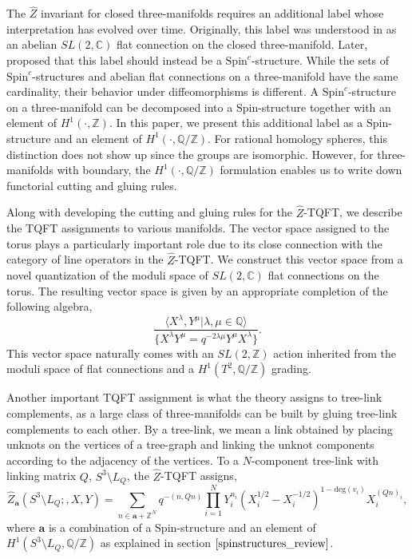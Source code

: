 \documentclass{article}
\newcommand{\Z}{{\mathbb Z}}
\newcommand{\C}{{\mathbb C}}
\newcommand{\Q}{{\mathbb Q}}
\numberwithin{corollary}{theorem}
\numberwithin{corollary}{proposition}
\begin{document}
 The $\hat{Z}$ invariant for closed three-manifolds requires an additional label whose interpretation has evolved over time. Originally, this label was understood in \cite{GPPV} as an abelian $SL(2,\C)$ flat connection on the closed three-manifold. Later, \cite{GM} proposed that this label should instead be a $\mathrm{Spin}^{c}$-structure. While the sets of $\mathrm{Spin}^{c}$-structures and abelian flat connections on a three-manifold have the same cardinality, their behavior under diffeomorphisms is different. A $\mathrm{Spin}^{c}$-structure on a three-manifold can be decomposed into a $\mathrm{Spin}$-structure together with an element of $H^{1}(\cdot,\Z)$. In this paper, we present this additional label as a $\mathrm{Spin}$-structure and an element of $H^{1}(\cdot,\Q/\Z)$. For rational homology spheres, this distinction does not show up since the groups are isomorphic. However, for three-manifolds with boundary, the $H^{1}(\cdot, \Q/\Z)$ formulation enables us to write down functorial cutting and gluing rules. 

Along with developing the cutting and gluing rules for the $\hat{Z}$-TQFT, we describe the TQFT assignments to various manifolds. The vector space assigned to the torus plays a particularly important role due to its close connection with the category of line operators in the $\hat{Z}$-TQFT. We construct this vector space from a novel quantization of the moduli space of $SL(2,\C)$ flat connections on the torus. The resulting vector space is given by an appropriate completion of the following algebra,
$$ \frac{\langle X^{\lambda}, Y^{\mu}\vert \lambda, \mu \in \Q \rangle}{\{ X^{\lambda} Y^{\mu} = q^{-2\lambda \mu} Y^{\mu} X^{\lambda} \} } . $$
This vector space naturally comes with an $SL(2,\Z)$ action inherited from the moduli space of flat connections and a $H^{1}(T^{2}, \Q/\Z)$ grading. 

Another important TQFT assignment is what the theory assigns to tree-link complements, as a large class of three-manifolds can be built by gluing tree-link complements to each other. By a tree-link, we mean a link obtained by placing unknots on the vertices of a tree-graph and linking the unknot components according to the adjacency of the vertices. To a $N$-component tree-link with linking matrix $Q$, $S^{3} \setminus L_{Q}$, the $\hat{Z}$-TQFT assigns,
$$ \hat{Z}_{\mathbf{a}}(S^{3} \setminus L_{Q};, X, Y )  = \sum_{n \in \mathbf{a} + \Z^N } q^{-(n,Q n)}  \prod^N_{i=1} Y_{i}^{n_{i}} (X_i^{1/2} - X_i^{-1/2})^{1-\mathrm{deg}(v_{i}) } X^{(Q n)_{i}}_{i}, $$
where $\mathbf{a}$ is a combination of a $\mathrm{Spin}$-structure and an element of $H^{1}(S^{3} \setminus L_{Q},\Q/\Z)$ as explained in section $\ref{spinstructures_review}$. 
\end{document}
